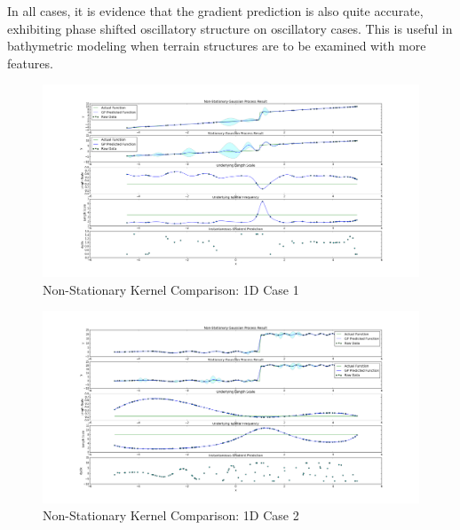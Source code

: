 				In all cases, it is evidence that the gradient prediction is also quite accurate, exhibiting phase shifted oscillatory structure on oscillatory cases. This is useful in bathymetric modeling when terrain structures are to be examined with more features.
				
				\begin{figure}[!htbp]
					\centering
						\includegraphics[width=\textwidth]{Figures/Progress/figure_1Dcase1.png}
					\caption{Non-Stationary Kernel Comparison: 1D Case 1}
					\label{ProgressReport:GaussianProcessModels:Figure:figure_1Dcase1}
				\end{figure}

				\begin{figure}[!htbp]
					\centering
						\includegraphics[width=\textwidth]{Figures/Progress/figure_1Dcase2.png}
					\caption{Non-Stationary Kernel Comparison: 1D Case 2}
					\label{ProgressReport:GaussianProcessModels:Figure:figure_1Dcase2}
				\end{figure}
				
